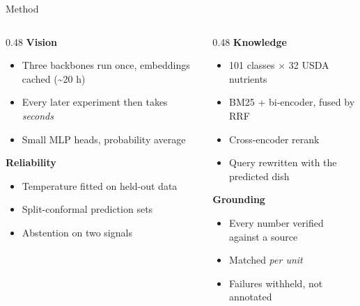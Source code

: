 \documentclass[aspectratio=169,11pt]{beamer}
\begin{document}
\begin{frame}{Method}
\begin{columns}[T]
\begin{column}{0.48\textwidth}
\textbf{Vision}
\begin{itemize}
  \item Three backbones run once, embeddings cached (\textasciitilde20 h)
  \item Every later experiment then takes \emph{seconds}
  \item Small MLP heads, probability average
\end{itemize}
\vspace{0.7em}
\textbf{Reliability}
\begin{itemize}
  \item Temperature fitted on held-out data
  \item Split-conformal prediction sets
  \item Abstention on two signals
\end{itemize}
\end{column}
\begin{column}{0.48\textwidth}
\textbf{Knowledge}
\begin{itemize}
  \item 101 classes $\times$ 32 USDA nutrients
  \item BM25 + bi-encoder, fused by RRF
  \item Cross-encoder rerank
  \item Query rewritten with the predicted dish
\end{itemize}
\vspace{0.7em}
\textbf{Grounding}
\begin{itemize}
  \item Every number verified against a source
  \item Matched \emph{per unit}
  \item Failures withheld, not annotated
\end{itemize}
\end{column}
\end{columns}
\end{frame}
\end{document}
